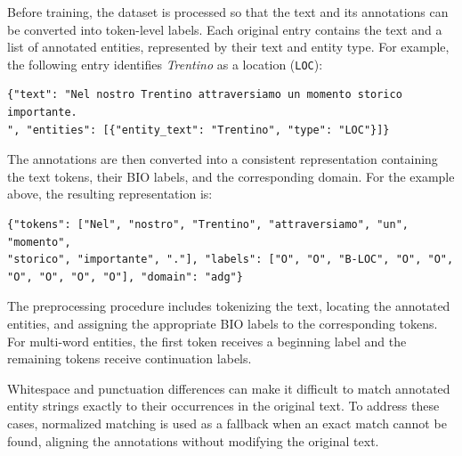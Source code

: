 Before training, the dataset is processed so that the text and its annotations can be converted into token-level labels. Each original entry contains the text and a list of annotated entities, represented by their text and entity type. For example, the following entry identifies \textit{Trentino} as a location (\texttt{LOC}):

\begin{verbatim}
{"text": "Nel nostro Trentino attraversiamo un momento storico importante.
", "entities": [{"entity_text": "Trentino", "type": "LOC"}]}
\end{verbatim}

The annotations are then converted into a consistent representation containing the text tokens, their BIO labels, and the corresponding domain. For the example above, the resulting representation is:

\begin{verbatim}
{"tokens": ["Nel", "nostro", "Trentino", "attraversiamo", "un", "momento",
"storico", "importante", "."], "labels": ["O", "O", "B-LOC", "O", "O",
"O", "O", "O", "O"], "domain": "adg"}
\end{verbatim}

The preprocessing procedure includes tokenizing the text, locating the annotated entities, and assigning the appropriate BIO labels to the corresponding tokens. For multi-word entities, the first token receives a beginning label and the remaining tokens receive continuation labels.

Whitespace and punctuation differences can make it difficult to match annotated entity strings exactly to their occurrences in the original text. To address these cases, normalized matching is used as a fallback when an exact match cannot be found, aligning the annotations without modifying the original text.